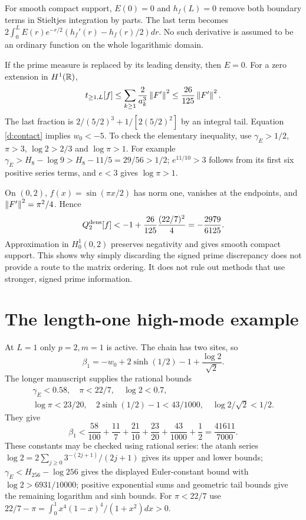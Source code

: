 For smooth compact support, $E(0)=0$ and $h_f(L)=0$ remove both boundary
terms in Stieltjes integration by parts. The last term becomes
$2\int_0^L E(r)e^{-r/2}(h_f'(r)-h_f(r)/2)dr$. No such derivative is
assumed to be an ordinary function on the whole logarithmic domain.

If the prime measure is replaced by its leading density, then $E=0$.
For a zero extension in $H^1(\mathbb R)$,
\[
t_{\ge1,L}[f]\le\sum_{k\ge1}\frac2{a_k^3}\left\lVert F'\right\rVert^2
\le\frac{26}{125}\left\lVert F'\right\rVert^2.
\]
The last fraction is $2/(5/2)^3+1/[2(5/2)^2]$ by an integral tail.
Equation \eqref{d:contact} implies $w_0<-5$. To check the elementary
inequality, use $\gamma_E>1/2$, $\pi>3$, $\log2>2/3$ and $\log\pi>1$.
For example
$\gamma_E>H_8-\log9>H_8-11/5=29/56>1/2$;
$e^{11/10}>3$ follows from its first six positive series terms,
and $e<3$ gives $\log\pi>1$.

On $(0,2)$, $f(x)=\sin(\pi x/2)$ has norm one, vanishes at the endpoints,
and $\left\lVert F'\right\rVert^2=\pi^2/4$. Hence
\[
Q_2^{\rm dens}[f]<-1+\frac{26}{125}\frac{(22/7)^2}{4}
=-\frac{2979}{6125}.
\]
Approximation in $H_0^1(0,2)$ preserves negativity and gives smooth compact
support. This shows why simply discarding the signed prime discrepancy
does not provide a route to the matrix ordering. It does not rule out
methods that use stronger, signed prime information.

\section{The length-one high-mode example}
At $L=1$ only $p=2,m=1$ is active. The chain has two sites, so
\[
\beta_1=-w_0+2\sinh(1/2)-1+\frac{\log2}{\sqrt2}.
\]
The longer manuscript supplies the rational bounds
\[
\begin{gathered}
\gamma_E<0.58,\quad\pi<22/7,\quad\log2<0.7,\\
\log\pi<23/20,\quad2\sinh(1/2)-1<43/1000,\quad
\log2/\sqrt2<1/2.
\end{gathered}
\]
They give
\[
\beta_1<\frac{58}{100}+\frac{11}{7}+\frac{21}{10}
+\frac{23}{20}+\frac{43}{1000}+\frac12=\frac{41611}{7000}.
\]
These constants may be checked using rational series: the atanh series
$\log2=2\sum_{j\ge0}3^{-(2j+1)}/(2j+1)$ gives its upper and lower bounds;
$\gamma_E<H_{256}-\log256$ gives the displayed Euler-constant bound
with $\log2>6931/10000$; positive exponential sums and geometric tail
bounds give the remaining logarithm and sinh bounds. For $\pi<22/7$ use
$22/7-\pi=\int_0^1x^4(1-x)^4/(1+x^2)dx>0$.

